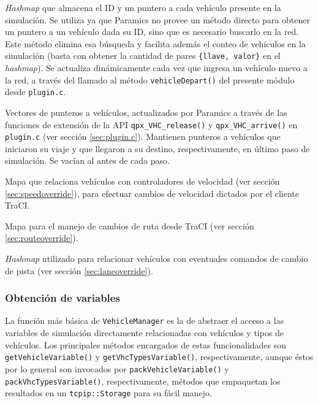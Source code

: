 \begin{description}[]
    \item[\texttt{vehicles\_in\_sim}] \emph{Hashmap} que almacena el ID y un puntero a cada vehículo presente en la simulación. Se utiliza ya que Paramics no provee un método directo para obtener un puntero a un vehículo dada su ID, sino que es necesario buscarlo en la red. Este método elimina esa búsqueda y facilita además el conteo de vehículos en la simulación (basta con obtener la cantidad de pares \texttt{\{llave, valor\}} en el \emph{hashmap}). Se actualiza dinámicamente cada vez que ingresa un vehículo nuevo a la red, a través del llamado al método \texttt{vehicleDepart()} del presente módulo desde \texttt{plugin.c}.
    
    \item[\texttt{departed\_vehicles} y \texttt{arrived\_vehicles}] Vectores de punteros a vehículos, actualizados por Paramics a través de las funciones de extensión de la API \texttt{qpx\_VHC\_release()} y \texttt{qpx\_VHC\_arrive()} en \texttt{plugin.c} (ver sección \ref{sec:plugin.c}). Mantienen punteros a vehículos que iniciaron su viaje y que llegaron a su destino, respectivamente, en último paso de simulación. Se vacían al antes de cada paso.
    
    \item[\texttt{speed\_controllers}] Mapa que relaciona vehículos con controladores de velocidad (ver sección \ref{sec:speedoverride}), para efectuar cambios de velocidad dictados por el cliente TraCI.
    
    \item [\texttt{vhc\_routes}] Mapa para el manejo de cambios de ruta desde TraCI (ver sección \ref{sec:routeoverride}).
    
    \item[\texttt{lane\_set\_triggers}] \emph{Hashmap} utilizado para relacionar vehículos con eventuales comandos de cambio de pista (ver sección \ref{sec:laneoverride}).
\end{description}

\subsubsection{Obtención de variables}

La función más básica de \texttt{VehicleManager} es la de abstraer el acceso a las variables de simulación directamente relacionadas con vehículos y tipos de vehículos. Los principales métodos encargados de estas funcionalidades son \texttt{getVehicleVariable()} y \texttt{getVhcTypesVariable()}, respectivamente, aunque éstos por lo general son invocados por \texttt{packVehicleVariable()} y \texttt{packVhcTypesVariable()}, respectivamente, métodos que empaquetan los resultados en un \texttt{tcpip::Storage} para su fácil manejo. 


